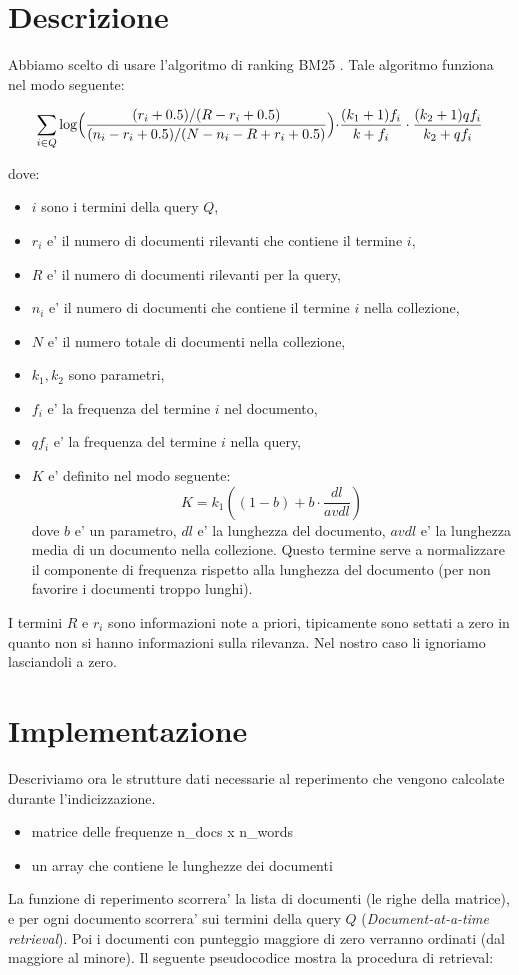 \documentclass[12pt]{article}
\begin{document}
\maketitle

\section{Descrizione}

Abbiamo scelto di usare l'algoritmo di ranking BM25 .
Tale algoritmo funziona nel modo seguente:

\[ \sum\limits_{i \in Q}\log\Bigl(\frac{(r_i+0.5)/(R-r_i+0.5)}{(n_i-r_i+0.5)/(N-n_i-R+r_i+0.5)}\Bigl)\cdot\frac{(k_1+1)f_i}{k+f_i}\cdot\frac{(k_2+1)qf_i}{k_2+qf_i} \]

dove:
\begin{itemize}
\item $i$ sono i termini della query $Q$, 
\item $r_i$ e' il numero di documenti rilevanti che contiene il termine $i$,
\item $R$ e' il numero di documenti rilevanti per la query, 
\item $n_i$ e' il numero di documenti che contiene il termine $i$ nella collezione,
\item $N$ e' il numero totale di documenti nella collezione, 
\item $k_1, k_2$ sono parametri,
\item $f_i$ e' la frequenza del termine $i$ nel documento,
\item $qf_i$ e' la frequenza del termine $i$ nella query,
\item $K$ e' definito nel modo seguente:
\[ K = k_1((1-b) +b \cdot \frac{dl}{avdl}) \]
dove $b$ e' un parametro, $dl$ e' la lunghezza del documento, $avdl$ e' la lunghezza media di un documento nella collezione. Questo termine serve a normalizzare il componente di frequenza rispetto alla lunghezza del documento (per non favorire i documenti troppo lunghi).
\end{itemize}
I termini $R$ e $r_i$ sono informazioni note a priori, tipicamente sono settati a zero in quanto non si hanno informazioni sulla rilevanza. Nel nostro caso li ignoriamo lasciandoli a zero.

\section{Implementazione}
 
Descriviamo ora le strutture dati necessarie al reperimento che vengono calcolate durante l'indicizzazione. 
\begin{itemize}
\item matrice delle frequenze n\_docs x n\_words
\item un array che contiene le lunghezze dei documenti
\end{itemize}
La funzione di reperimento scorrera' la lista di documenti (le righe della matrice), e per ogni documento scorrera' sui termini della query $Q$ (\textit{Document-at-a-time retrieval}). Poi i documenti con punteggio maggiore di zero verranno ordinati (dal maggiore al minore). Il seguente pseudocodice mostra la procedura di retrieval:
\end{document}

